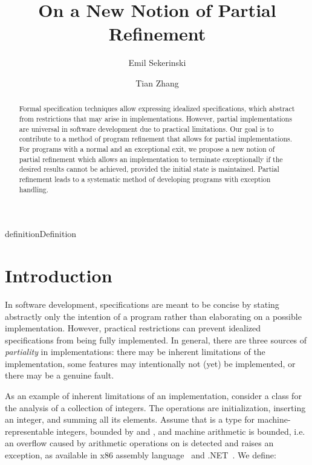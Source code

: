 \documentclass[submission,copyright,creativecommons]{eptcs}
\title{On a New Notion of Partial Refinement}
\author{Emil Sekerinski
  \institute{McMaster University\\ Hamilton, Canada}
  \email{emil@mcmaster.ca}
\and Tian Zhang
  \institute{McMaster University\\ Hamilton, Canada}
  \email{zhangt26@mcmaster.ca}
}
\begin{document}
\maketitle

\newenvironment{eqnarr}
{}
\newtheorem{definition}{Definition}
\newtheorem{theorem}{Theorem}
\newenvironment{proof}{\par\noindent\em Proof.}{\par}

\begin{abstract}

Formal specification techniques allow expressing idealized specifications, which abstract from restrictions that may arise in implementations. However, partial implementations are universal in software development due to practical limitations. Our goal is to contribute to a method of program refinement that allows for partial implementations. For programs with a normal and an exceptional exit, we propose a new notion of partial refinement which allows an implementation to terminate exceptionally if the desired results cannot be achieved, provided the initial state is maintained. Partial refinement leads to a systematic method of developing programs with exception handling.

\end{abstract}

\section{Introduction}

In software development, specifications are meant to be concise by stating abstractly only the intention of a program rather than elaborating on a possible implementation. However, practical restrictions can prevent idealized specifications from being fully implemented. In general, there are three sources of {\em partiality} in implementations: there may be inherent limitations of the implementation, some features may intentionally not (yet) be implemented, or there may be a genuine fault.

As an example of inherent limitations of an implementation, consider a class for the analysis of a collection of integers. The operations are initialization, inserting an integer, and summing all its elements. Assume that  is a type for machine-representable integers, bounded by  and , and machine arithmetic is bounded, i.e. an overflow caused by arithmetic operations on  is detected and raises an exception, as available in x86 assembly language~\cite{Intel13Assembly} and .NET~\cite{MS13OverflowException}.
We define:
\end{document}
